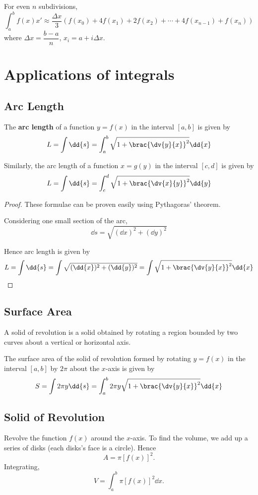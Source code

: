 For even $n$ subdivisions,
\begin{equation}
\int_a^bf(x)x' \approx \frac {\Delta x}{3} (f(x_0) + 4f(x_1) + 2f(x_2) + \cdots + 4f(x_{n-1} )+ f(x_n))
\end{equation}
where $\Delta x = \dfrac{b-a}{n}$, $x_i =a+ i\Delta x$.

\section{Applications of integrals}
\subsection{Arc Length}
The \textbf{arc length} of a function $y=f(x)$ in the interval $[a,b]$ is given by
\begin{equation}
L = \int\dd{s} = \int_a^b\sqrt{1+\brac{\dv{y}{x}}^2}\dd{x}
\end{equation}

Similarly, the arc length of a function $x=g(y)$ in the interval $[c,d]$ is given by
\[ L = \int\dd{s} = \int_c^d\sqrt{1+\brac{\dv{x}{y}}^2}\dd{y} \]

\begin{proof}
These formulae can be proven easily using Pythagoras' theorem.

Considering one small section of the arc,
\[ \dd{s}=\sqrt{(\dd{x})^2+(\dd{y})^2} \]

Hence arc length is given by
\[ L = \int\dd{s} = \int\sqrt{(\dd{x})^2+(\dd{y})^2} = \int\sqrt{1+\brac{\dv{y}{x}}^2}\dd{x} \]
\end{proof}

\subsection{Surface Area}
A solid of revolution is a solid obtained by rotating a region bounded by two curves about a vertical or horizontal axis.

The surface area of the solid of revolution formed by rotating $y=f(x)$ in the interval $[a,b]$ by $2\pi$ about the $x$-axis is given by
\begin{equation}
S = \int2\pi y\dd{s} = \int_a^b 2\pi y \sqrt{1+\brac{\dv{y}{x}}^2}\dd{x}
\end{equation}

\subsection{Solid of Revolution}
Revolve the function $f(x)$ around the $x$-axis. To find the volume, we add up a series of disks (each disks's face is a circle). Hence
\[ A=\pi[f(x)]^2. \]
Integrating,
\[ V=\int_a^b\pi[f(x)]^2\dd{x}. \]

